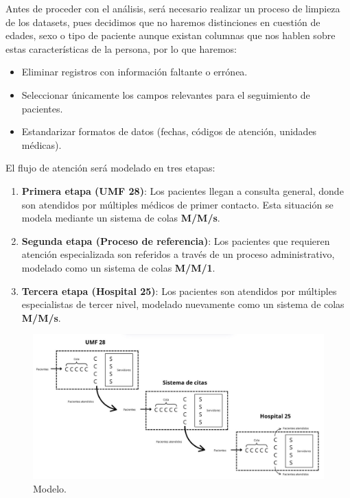 \documentclass[10pt]{article}
\begin{document}
    Antes de proceder con el análisis, será necesario realizar un proceso de limpieza de los datasets, pues decidimos que no haremos distinciones en cuestión de edades, sexo o tipo de paciente aunque existan columnas que nos hablen sobre estas características de la persona, por lo que haremos: \par
    \begin{itemize}
        \item Eliminar registros con información faltante o errónea.
        \item Seleccionar únicamente los campos relevantes para el seguimiento de pacientes.
        \item Estandarizar formatos de datos (fechas, códigos de atención, unidades médicas).
    \end{itemize}
    
    El flujo de atención será modelado en tres etapas:

    \begin{enumerate}
        \item \textbf{Primera etapa (UMF 28)}: Los pacientes llegan a consulta general, donde son atendidos por múltiples médicos de primer contacto. Esta situación se modela mediante un sistema de colas \textbf{M/M/s}.
        
        \item \textbf{Segunda etapa (Proceso de referencia)}: Los pacientes que requieren atención especializada son referidos a través de un proceso administrativo, modelado como un sistema de colas \textbf{M/M/1}.
        
        \item \textbf{Tercera etapa (Hospital 25)}: Los pacientes son atendidos por múltiples especialistas de tercer nivel, modelado nuevamente como un sistema de colas \textbf{M/M/s}.
    \end{enumerate}

    \begin{figure}[h]
		\centering
		\includegraphics[width=130mm]{./images/sistema.jpg}
		\caption{Modelo.}
	\end{figure}
\end{document}

